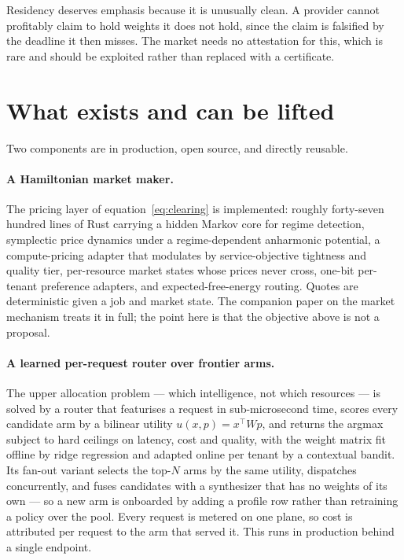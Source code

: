 \documentclass[11pt,a4paper]{article}
\begin{document}
Residency deserves emphasis because it is unusually clean. A provider cannot
profitably claim to hold weights it does not hold, since the claim is falsified
by the deadline it then misses. The market needs no attestation for this, which
is rare and should be exploited rather than replaced with a certificate.

\section{What exists and can be lifted}

Two components are in production, open source, and directly reusable.

\paragraph{A Hamiltonian market maker.} The pricing layer of
equation~\eqref{eq:clearing} is implemented: roughly forty-seven hundred lines of
Rust carrying a hidden Markov core for regime detection, symplectic price
dynamics under a regime-dependent anharmonic potential, a compute-pricing adapter
that modulates by service-objective tightness and quality tier, per-resource
market states whose prices never cross, one-bit per-tenant preference adapters,
and expected-free-energy routing. Quotes are deterministic given a job and market
state. The companion paper on the market mechanism treats it in full; the point
here is that the objective above is not a proposal.

\paragraph{A learned per-request router over frontier arms.} The upper allocation
problem --- which intelligence, not which resources --- is solved by a router that
featurises a request in sub-microsecond time, scores every candidate arm by a
bilinear utility $u(x,p)=x^{\top}Wp$, and returns the argmax subject to hard
ceilings on latency, cost and quality, with the weight matrix fit offline by ridge
regression and adapted online per tenant by a contextual bandit. Its fan-out
variant selects the top-$N$ arms by the same utility, dispatches concurrently, and
fuses candidates with a synthesizer that has no weights of its own --- so a new
arm is onboarded by adding a profile row rather than retraining a policy over the
pool. Every request is metered on one plane, so cost is attributed per request to
the arm that served it. This runs in production behind a single endpoint.
\end{document}
